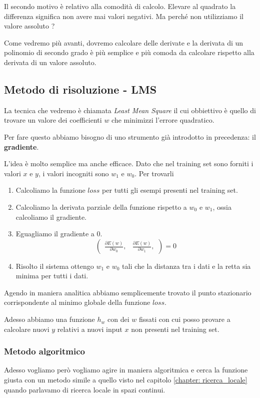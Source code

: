 Il secondo motivo \`e relativo alla comodit\`a di calcolo. Elevare al quadrato la differenza significa non avere mai valori
negativi. Ma perch\'e non utilizziamo il valore assoluto ?

Come vedremo pi\`u avanti, dovremo calcolare delle derivate e la derivata di un polinomio di secondo grado \`e pi\`u
semplice e pi\`u comoda da calcolare rispetto alla derivata di un valore assoluto.

\subsection{Metodo di risoluzione - LMS}
La tecnica che vedremo \`e chiamata \emph{Least Mean Square} il cui obbiettivo \`e quello di trovare un valore dei
coefficienti $w$ che minimizzi l'errore quadratico.

Per fare questo abbiamo bisogno di uno strumento gi\`a introdotto in precedenza: il \textbf{gradiente}.

L'idea \`e molto semplice ma anche efficace. Dato che nel training set sono forniti i valori $x$ e $y$, i valori incogniti
sono $w_1$ e $w_0$. Per trovarli
\begin{enumerate}
	\item Calcoliamo la funzione $loss$ per tutti gli esempi presenti nel training set.
	\item Calcoliamo la derivata parziale della funzione rispetto a $w_0$ e $w_1$, ossia calcoliamo il gradiente.
	\item Eguagliamo il gradiente a 0.
	      \[
		      \begin{pmatrix}
			      \displaystyle\frac{ \partial E(w) }{ \partial w_0 }, &
			      \displaystyle\frac{ \partial E(w) }{ \partial w_1 },
		      \end{pmatrix} = 0
	      \]
	\item Risolto il sistema ottengo $w_1$ e $w_0$ tali che la distanza tra i dati e la retta sia minima per tutti i dati.
\end{enumerate}
Agendo in maniera analitica abbiamo semplicemente trovato il punto stazionario corrispondente al minimo globale della
funzione $loss$.

Adesso abbiamo una funzione $h_w$ con dei $w$ fissati con cui posso provare a calcolare nuovi $y$ relativi a nuovi
input $x$ non presenti nel training set.

\subsubsection{Metodo algoritmico}
Adesso vogliamo per\`o vogliamo agire in maniera algoritmica e cerca la funzione giusta con un metodo simile a quello
visto nel capitolo \ref{chapter: ricerca_locale} quando parlavamo di ricerca locale in spazi continui.

